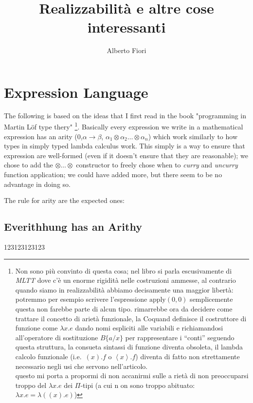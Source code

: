 \documentclass[11pt,a5paper,draft,oneside]{report}
\author{Alberto Fiori}
\title{Realizzabilità e altre cose interessanti}
\begin{document}

\chapter{Expression Language}
	The following is based on the ideas that I first read in the book "programming in Martin Löf type thery" 
	\footnote{Non sono più convinto di questa cosa; nel libro si parla escusivamente di \emph{MLTT} dove c'è un enorme rigidità nelle costruzioni ammesse, al contrario quando siamo in realizzabilità abbiamo decisamente una maggior libertà: potremmo per esempio scrivere l'espressione $\text{apply}(0,0)$ semplicemente questa non farebbe parte di alcun tipo.
	rimarrebbe ora da decidere come trattare il concetto di arietà funzionale, la Coquand definisce il costruttore di funzione come $\lambda x . e$ dando nomi espliciti alle variabili e richiamandosi all'operatore di sostituzione $B\{a/x\}$ per rappresentare i ``conti'' seguendo questa struttura, la consueta sintassi di funzione diventa obsoleta, il lambda calcolo funzionale (i.e.\ $(x).f$ o $\left\langle x\right\rangle.f$) diventa di fatto non strettamente necessario negli usi che servono nell'articolo. \\ questo mi porta a propormi di non accanirmi sulle a
	rietà di non preoccuparsi troppo del $\lambda x.e$ dei $\Pi$-tipi (a cui n
	on sono troppo abituato: $\lambda x.e 
	= \lambda ((x).e)$) 
	}. 
	Basically every expression we write in a mathematical expression has an arity (0,$\alpha\rightarrow\beta$, $\alpha_1\otimes\alpha_2\ldots\otimes\alpha_n$) which work similarly to how types in simply typed lambda calculus work. 
	This simply is a way to ensure that expression are well-formed (even if it doesn't ensure that they are reasonable); we chose to add the $\otimes\ldots\otimes$ constructor to freely chose when to \emph{curry} and \emph{uncurry} function application; we could have added more, but there seem to be no advantage in doing so.
	
	The rule for arity are the expected ones:
	
	
	\section{Everithhung has an Arithy} 
		123123123123
\end{document}
